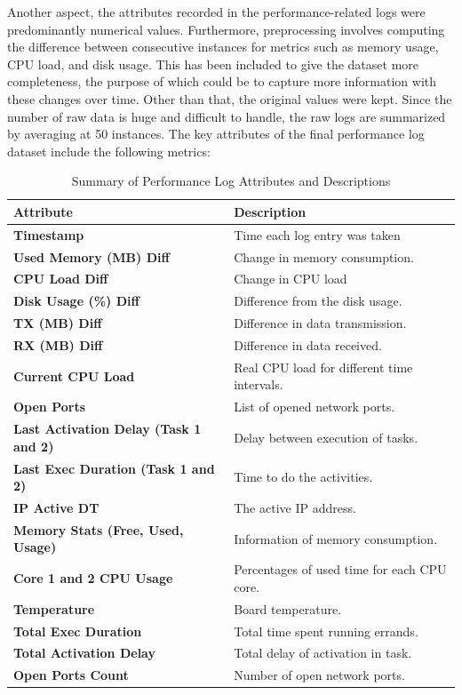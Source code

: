 \documentclass[Master,BMR,english]{twbook}
\begin{document}
Another aspect, the attributes recorded in the performance-related logs were predominantly numerical values. Furthermore, preprocessing involves computing the difference between consecutive instances for metrics such as memory usage, CPU load, and disk usage. This has been included to give the dataset more completeness, the purpose of which could be to capture more information with these changes over time. Other than that, the original values were kept. Since the number of raw data is huge and difficult to handle, the raw logs are summarized by averaging at 50 instances. The key attributes of the final performance log dataset include the following metrics:

\begin{table}[!htbp]
\centering
\begin{tabular}{|l|p{10cm}|}
\hline
\textbf{Attribute} & \textbf{Description} \\ \hline
\textbf{Timestamp} & Time each log entry was taken\\ \hline
\textbf{Used Memory (MB) Diff} & Change in memory consumption.
\\ \hline
\textbf{CPU Load Diff} & Change in CPU load\\ \hline
\textbf{Disk Usage (\%) Diff} & Difference from the disk usage.
\\ \hline
\textbf{TX (MB) Diff} & Difference in data transmission.
\\ \hline
\textbf{RX (MB) Diff} & Difference in data received.
\\ \hline
\textbf{Current CPU Load} & Real CPU load for different time intervals.
\\ \hline
\textbf{Open Ports} & List of opened network ports.
\\ \hline
\textbf{Last Activation Delay (Task 1 and 2)} & Delay between execution of tasks.
\\ \hline
\textbf{Last Exec Duration (Task 1 and 2)} & Time to do the activities.
\\ \hline
\textbf{IP Active DT} & The active IP address.
\\ \hline
\textbf{Memory Stats (Free, Used, Usage)} & Information of memory consumption.
\\ \hline
\textbf{Core 1 and 2 CPU Usage} & Percentages of used time for each CPU core.
\\ \hline
\textbf{Temperature} & Board temperature.
\\ \hline
\textbf{Total Exec Duration} & Total time spent running errands.
\\ \hline
\textbf{Total Activation Delay} & Total delay of activation in task.
\\ \hline
\textbf{Open Ports Count} & Number of open network ports.
\\ \hline
\end{tabular}
\caption{Summary of Performance Log Attributes and Descriptions}
\label{tab:performance_log_attributes}
\end{table}
\end{document}
